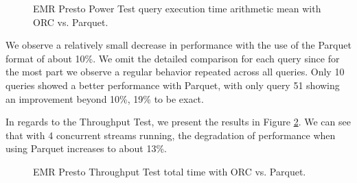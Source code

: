 \begin{figure}
   \begin{center}
   \end{center}
   \caption{EMR Presto Power Test query execution time arithmetic mean with ORC vs. Parquet.}
   \label{fig:additionalResultsPrestoORCvsParquetPowerTestArithmeticMean}
\end{figure}

We observe a relatively small decrease in performance with the use of the Parquet format of about 10\%. We omit the detailed comparison for each query since for the most part we observe a regular behavior repeated across all queries. Only 10 queries showed a better performance with Parquet, with only query 51 showing an improvement beyond 10\%, 19\% to be exact.

In regards to the Throughput Test, we present the results in Figure \ref{fig:additionalResultsPrestoORCvsParquetTputTest}. We can see that with 4 concurrent streams running, the degradation of performance when using Parquet increases to about 13\%.

\begin{figure}
   \begin{center}
   \end{center}
   \caption{EMR Presto Throughput Test total time with ORC vs. Parquet.}
   \label{fig:additionalResultsPrestoORCvsParquetTputTest}
\end{figure}

